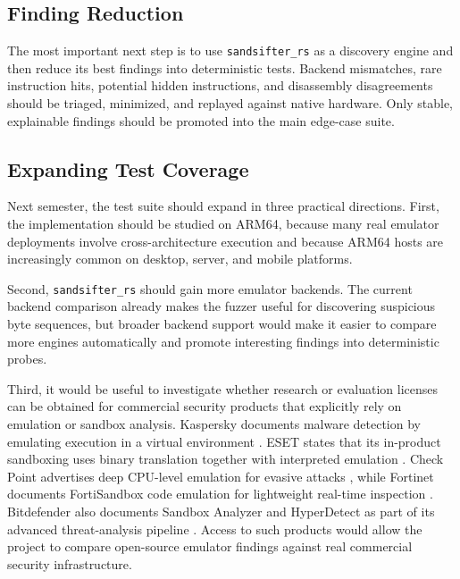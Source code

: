 
\subsection{Finding Reduction}

The most important next step is to use \texttt{sandsifter\_rs} as a discovery engine and then reduce its best findings into deterministic tests. Backend mismatches, rare instruction hits, potential hidden instructions, and disassembly disagreements should be triaged, minimized, and replayed against native hardware. Only stable, explainable findings should be promoted into the main edge-case suite.

\subsection{Expanding Test Coverage}

Next semester, the test suite should expand in three practical directions. First, the implementation should be studied on ARM64, because many real emulator deployments involve cross-architecture execution and because ARM64 hosts are increasingly common on desktop, server, and mobile platforms.

Second, \texttt{sandsifter\_rs} should gain more emulator backends. The current backend comparison already makes the fuzzer useful for discovering suspicious byte sequences, but broader backend support would make it easier to compare more engines automatically and promote interesting findings into deterministic probes.

Third, it would be useful to investigate whether research or evaluation licenses can be obtained for commercial security products that explicitly rely on emulation or sandbox analysis. Kaspersky documents malware detection by emulating execution in a virtual environment \cite{kaspersky-emulator}. ESET states that its in-product sandboxing uses binary translation together with interpreted emulation \cite{eset-whitepaper}. Check Point advertises deep CPU-level emulation for evasive attacks \cite{checkpoint-sandblast}, while Fortinet documents FortiSandbox code emulation for lightweight real-time inspection \cite{fortinet-fortisandbox}. Bitdefender also documents Sandbox Analyzer and HyperDetect as part of its advanced threat-analysis pipeline \cite{bitdefender-sandbox,bitdefender-hyperdetect}. Access to such products would allow the project to compare open-source emulator findings against real commercial security infrastructure.

